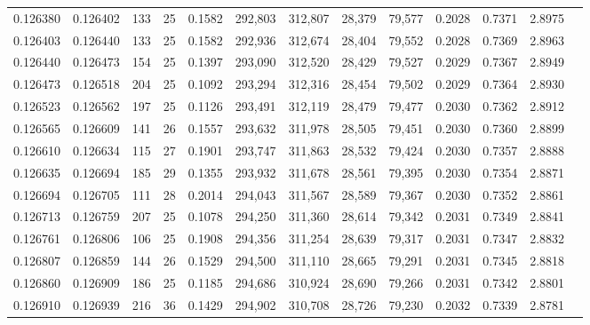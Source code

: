 \begin{tabular}{rrrrrrrrrrrrr}
0.126380 & 0.126402 & 133 &  25 &                                     0.1582 & 292,803 & 312,807 &  28,379 &  79,577 & 0.2028 & 0.7371 & 2.8975 \\
0.126403 & 0.126440 & 133 &  25 &                                     0.1582 & 292,936 & 312,674 &  28,404 &  79,552 & 0.2028 & 0.7369 & 2.8963 \\
0.126440 & 0.126473 & 154 &  25 &                                     0.1397 & 293,090 & 312,520 &  28,429 &  79,527 & 0.2029 & 0.7367 & 2.8949 \\
0.126473 & 0.126518 & 204 &  25 &                                     0.1092 & 293,294 & 312,316 &  28,454 &  79,502 & 0.2029 & 0.7364 & 2.8930 \\
0.126523 & 0.126562 & 197 &  25 &                                     0.1126 & 293,491 & 312,119 &  28,479 &  79,477 & 0.2030 & 0.7362 & 2.8912 \\
0.126565 & 0.126609 & 141 &  26 &                                     0.1557 & 293,632 & 311,978 &  28,505 &  79,451 & 0.2030 & 0.7360 & 2.8899 \\
0.126610 & 0.126634 & 115 &  27 &                                     0.1901 & 293,747 & 311,863 &  28,532 &  79,424 & 0.2030 & 0.7357 & 2.8888 \\
0.126635 & 0.126694 & 185 &  29 &                                     0.1355 & 293,932 & 311,678 &  28,561 &  79,395 & 0.2030 & 0.7354 & 2.8871 \\
0.126694 & 0.126705 & 111 &  28 &                                     0.2014 & 294,043 & 311,567 &  28,589 &  79,367 & 0.2030 & 0.7352 & 2.8861 \\
0.126713 & 0.126759 & 207 &  25 &                                     0.1078 & 294,250 & 311,360 &  28,614 &  79,342 & 0.2031 & 0.7349 & 2.8841 \\
0.126761 & 0.126806 & 106 &  25 &                                     0.1908 & 294,356 & 311,254 &  28,639 &  79,317 & 0.2031 & 0.7347 & 2.8832 \\
0.126807 & 0.126859 & 144 &  26 &                                     0.1529 & 294,500 & 311,110 &  28,665 &  79,291 & 0.2031 & 0.7345 & 2.8818 \\
0.126860 & 0.126909 & 186 &  25 &                                     0.1185 & 294,686 & 310,924 &  28,690 &  79,266 & 0.2031 & 0.7342 & 2.8801 \\
0.126910 & 0.126939 & 216 &  36 &                                     0.1429 & 294,902 & 310,708 &  28,726 &  79,230 & 0.2032 & 0.7339 & 2.8781 \\

\end{tabular}
